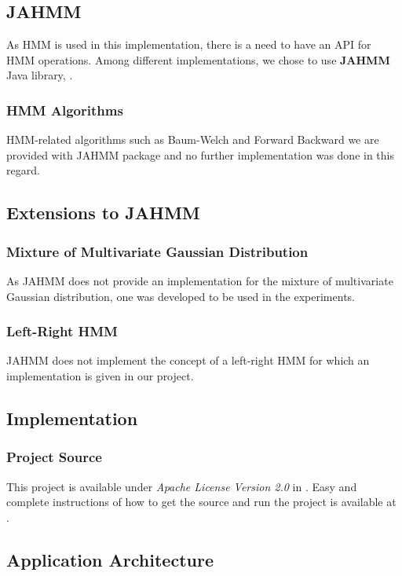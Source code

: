 \documentclass{acm_proc_article-sp}
\begin{document}
\subsection{JAHMM}
As HMM is used in this implementation, there is a need to have an API for HMM operations. Among different
implementations, we chose to use \textbf{JAHMM} Java library, \cite{jahmm}.

\subsubsection{HMM Algorithms}
HMM-related algorithms such as Baum-Welch and Forward Backward we are provided with JAHMM package and no further
implementation was done in this regard.

\subsection{Extensions to JAHMM}

\subsubsection{Mixture of Multivariate Gaussian Distribution}
As JAHMM does not provide an implementation for the mixture of multivariate Gaussian distribution, one was developed to
be used in the experiments.

\subsubsection{Left-Right HMM}
JAHMM does not implement the concept of a left-right HMM for which an implementation is given in our project.

\subsection{Implementation}

\subsubsection{Project Source}
This project is available under \textit{Apache License Version 2.0} in \cite{ftse}. Easy and complete instructions of
how to get the source and run the project is available at \cite{ftse:wiki}.

\subsection{Application Architecture}
\end{document}
